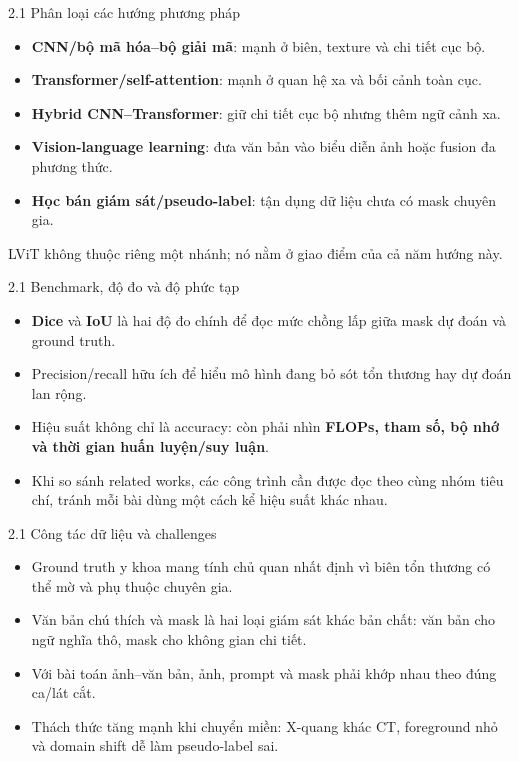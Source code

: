 \documentclass[aspectratio=169,11pt]{beamer}
\newcommand{\smallnote}[1]{%
  \par
  \vspace{0.08cm}
  {\footnotesize\color{ink}#1\par}
}
\begin{document}
\begin{frame}{2.1 Phân loại các hướng phương pháp}
  \begin{itemize}
    \item \textbf{CNN/bộ mã hóa--bộ giải mã}: mạnh ở biên, texture và chi tiết cục bộ.
    \item \textbf{Transformer/self-attention}: mạnh ở quan hệ xa và bối cảnh toàn cục.
    \item \textbf{Hybrid CNN--Transformer}: giữ chi tiết cục bộ nhưng thêm ngữ cảnh xa.
    \item \textbf{Vision-language learning}: đưa văn bản vào biểu diễn ảnh hoặc fusion đa phương thức.
    \item \textbf{Học bán giám sát/pseudo-label}: tận dụng dữ liệu chưa có mask chuyên gia.
  \end{itemize}
  \smallnote{LViT không thuộc riêng một nhánh; nó nằm ở giao điểm của cả năm hướng này.}
\end{frame}

\begin{frame}{2.1 Benchmark, độ đo và độ phức tạp}
  \begin{itemize}
    \item \textbf{Dice} và \textbf{IoU} là hai độ đo chính để đọc mức chồng lấp giữa mask dự đoán và ground truth.
    \item Precision/recall hữu ích để hiểu mô hình đang bỏ sót tổn thương hay dự đoán lan rộng.
    \item Hiệu suất không chỉ là accuracy: còn phải nhìn \textbf{FLOPs, tham số, bộ nhớ và thời gian huấn luyện/suy luận}.
    \item Khi so sánh related works, các công trình cần được đọc theo cùng nhóm tiêu chí, tránh mỗi bài dùng một cách kể hiệu suất khác nhau.
  \end{itemize}
\end{frame}

\begin{frame}{2.1 Công tác dữ liệu và challenges}
  \begin{itemize}
    \item Ground truth y khoa mang tính chủ quan nhất định vì biên tổn thương có thể mờ và phụ thuộc chuyên gia.
    \item Văn bản chú thích và mask là hai loại giám sát khác bản chất: văn bản cho ngữ nghĩa thô, mask cho không gian chi tiết.
    \item Với bài toán ảnh--văn bản, ảnh, prompt và mask phải khớp nhau theo đúng ca/lát cắt.
    \item Thách thức tăng mạnh khi chuyển miền: X-quang khác CT, foreground nhỏ và domain shift dễ làm pseudo-label sai.
  \end{itemize}
\end{frame}
\end{document}
